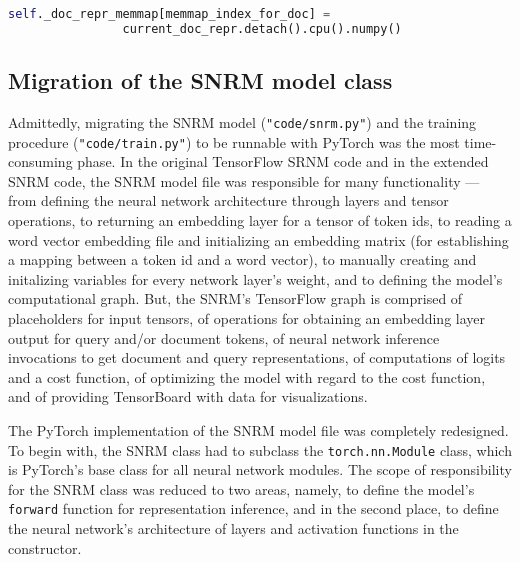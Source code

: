 \begin{lstlisting}[language=Python,frame=single,breaklines=true,float=tbh,caption=Conversion of a PyTorch tensor to a NumPy array to be usable for NumPy's memory mapping,label=conversion-pytorch-tensor-numpy-array]
self._doc_repr_memmap[memmap_index_for_doc] = 
                current_doc_repr.detach().cpu().numpy()
\end{lstlisting}

\subsection{Migration of the SNRM model class}
Admittedly, migrating the SNRM model (\texttt{"code/snrm.py"}) and the training procedure 
    (\texttt{"code/train.py"}) to be runnable with PyTorch was the most time-consuming phase.
In the original TensorFlow SRNM code and in the extended SNRM code, the SNRM model file
    was responsible for many functionality --- from defining the neural network architecture
    through layers and tensor operations, to returning an embedding layer for a tensor of token ids,
    to reading a word vector embedding file and initializing an embedding matrix 
    (for establishing a mapping between a token id and a word vector),
    to manually creating and initalizing variables for every network layer's weight,
    and to defining the model's computational graph.
But, the SNRM's TensorFlow graph is comprised of placeholders for input tensors,
    of operations for obtaining an embedding layer output for query and/or document tokens,
    of neural network inference invocations to get document and query representations,
    of computations of logits and a cost function, 
    of optimizing the model with regard to the cost function,
    and of providing TensorBoard with data for visualizations.

The PyTorch implementation of the SNRM model file was completely redesigned.
To begin with, the SNRM class had to subclass the \texttt{torch.nn.Module} class, which is PyTorch's
    base class for all neural network modules.
The scope of responsibility for the SNRM class was reduced to two areas,
    namely, to define the model's \texttt{forward} function for representation inference, 
    and in the second place, to define the neural network's architecture of layers and activation functions
    in the constructor.

